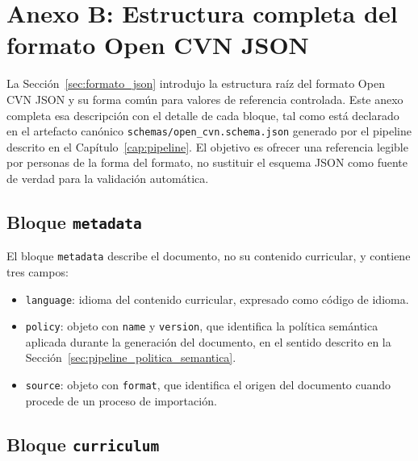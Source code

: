 \chapter*{Anexo B: Estructura completa del formato Open CVN JSON}
\label{cap:anexo_formato_json}

\setcounter{section}{0}
\renewcommand{\thesection}{B.\arabic{section}}
\setcounter{table}{0}
\renewcommand{\thetable}{B.\arabic{table}}

La Sección~\ref{sec:formato_json} introdujo la estructura raíz del formato
Open CVN JSON y su forma común para valores de referencia controlada. Este
anexo completa esa descripción con el detalle de cada bloque, tal como está
declarado en el artefacto canónico \texttt{schemas/open\_cvn.schema.json}
generado por el pipeline descrito en el
Capítulo~\ref{cap:pipeline}. El objetivo es ofrecer una referencia legible
por personas de la forma del formato, no sustituir el esquema JSON como
fuente de verdad para la validación automática.

\section{Bloque \texttt{metadata}}
\label{sec:anexo_formato_metadata}

El bloque \texttt{metadata} describe el documento, no su contenido
curricular, y contiene tres campos:

\begin{itemize}
  \item \texttt{language}: idioma del contenido curricular, expresado como
  código de idioma.

  \item \texttt{policy}: objeto con \texttt{name} y \texttt{version}, que
  identifica la política semántica aplicada durante la generación del
  documento, en el sentido descrito en la
  Sección~\ref{sec:pipeline_politica_semantica}.

  \item \texttt{source}: objeto con \texttt{format}, que identifica el
  origen del documento cuando procede de un proceso de importación.
\end{itemize}

\section{Bloque \texttt{curriculum}}
\label{sec:anexo_formato_curriculum}

